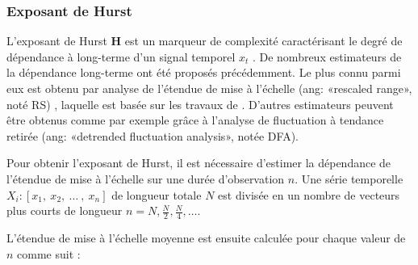 \subsubsection*{Exposant de Hurst}

L'exposant de Hurst $\textbf{H}$ est un marqueur de complexité caractérisant le degré de dépendance à long-terme d'un signal temporel $x_t$ \citep{hurst1951long}.  
De nombreux estimateurs de la dépendance long-terme ont été proposés précédemment. 
Le plus connu parmi eux est obtenu par analyse de l'étendue de mise à l'échelle (ang: «rescaled range», noté RS) \citep{mandelbrot1968noah, mandelbrot1969robustness}, laquelle est basée sur les travaux de \cite{hurst1951long}. 
D'autres estimateurs peuvent être obtenus comme par exemple grâce à l'analyse de fluctuation à tendance retirée (ang: «detrended fluctuation analysis», notée DFA). 

Pour obtenir l'exposant de Hurst, il est nécessaire d'estimer la dépendance de l'étendue de mise à l'échelle sur une durée d'observation $n$. 
Une série temporelle $X_i : [x_1,~x_2,~\ldots~,~x_n]$ de longueur totale $N$ est divisée en un nombre de vecteurs plus courts de longueur $n=N, \frac{N}{2}, \frac{N}{4},\ldots$. 

L'étendue de mise à l'échelle moyenne est ensuite calculée pour chaque valeur de $n$ comme suit : 

